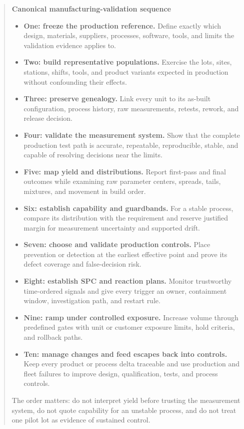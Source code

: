 \begin{quote}
\noindent\textbf{Canonical manufacturing-validation sequence}\\[0.4em]
\begin{itemize}
\item \textbf{One: freeze the production reference.} Define exactly which
      design, materials, suppliers, processes, software, tools, and limits the
      validation evidence applies to.
\item \textbf{Two: build representative populations.} Exercise the lots,
      sites, stations, shifts, tools, and product variants expected in
      production without confounding their effects.
\item \textbf{Three: preserve genealogy.} Link every unit to its as-built
      configuration, process history, raw measurements, retests, rework, and
      release decision.
\item \textbf{Four: validate the measurement system.} Show that the complete
      production test path is accurate, repeatable, reproducible, stable, and
      capable of resolving decisions near the limits.
\item \textbf{Five: map yield and distributions.} Report first-pass and final
      outcomes while examining raw parameter centers, spreads, tails, mixtures,
      and movement in build order.
\item \textbf{Six: establish capability and guardbands.} For a stable process,
      compare its distribution with the requirement and reserve justified
      margin for measurement uncertainty and supported drift.
\item \textbf{Seven: choose and validate production controls.} Place
      prevention or detection at the earliest effective point and prove its
      defect coverage and false-decision risk.
\item \textbf{Eight: establish SPC and reaction plans.} Monitor
      trustworthy time-ordered signals and give every trigger an owner,
      containment window, investigation path, and restart rule.
\item \textbf{Nine: ramp under controlled exposure.} Increase volume through
      predefined gates with unit or customer exposure limits, hold criteria,
      and rollback paths.
\item \textbf{Ten: manage changes and feed escapes back into controls.} Keep
      every product or process delta traceable and use production and fleet
      failures to improve design, qualification, tests, and process controls.
\end{itemize}
The order matters: do not interpret yield before trusting the measurement
system, do not quote capability for an unstable process, and do not treat one
pilot lot as evidence of sustained control.
\end{quote}

